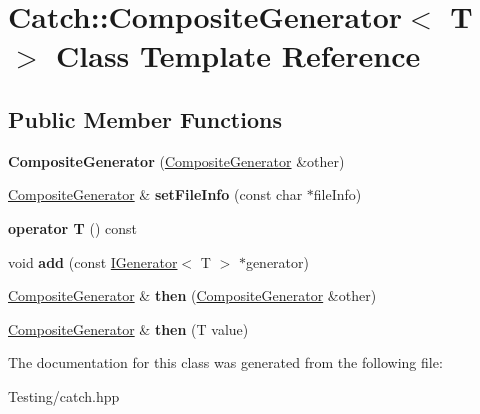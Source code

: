 \hypertarget{class_catch_1_1_composite_generator}{\section{Catch\-:\-:Composite\-Generator$<$ T $>$ Class Template Reference}
\label{class_catch_1_1_composite_generator}
}
\subsection*{Public Member Functions}
\begin{DoxyCompactItemize}
\item 
\hypertarget{class_catch_1_1_composite_generator_a21a7070a00e4a6fe021294c356692692}{{\bfseries Composite\-Generator} (\hyperlink{class_catch_1_1_composite_generator}{Composite\-Generator} \&other)}\label{class_catch_1_1_composite_generator_a21a7070a00e4a6fe021294c356692692}

\item 
\hypertarget{class_catch_1_1_composite_generator_ac3c57cf4ca5472f440bf71e2936bcd4a}{\hyperlink{class_catch_1_1_composite_generator}{Composite\-Generator} \& {\bfseries set\-File\-Info} (const char $\ast$file\-Info)}\label{class_catch_1_1_composite_generator_ac3c57cf4ca5472f440bf71e2936bcd4a}

\item 
\hypertarget{class_catch_1_1_composite_generator_aa3f627d84fb256df0404d19d7fd4b784}{{\bfseries operator T} () const }\label{class_catch_1_1_composite_generator_aa3f627d84fb256df0404d19d7fd4b784}

\item 
\hypertarget{class_catch_1_1_composite_generator_af3774d42ad2d3453d089ca599efe0517}{void {\bfseries add} (const \hyperlink{struct_catch_1_1_i_generator}{I\-Generator}$<$ T $>$ $\ast$generator)}\label{class_catch_1_1_composite_generator_af3774d42ad2d3453d089ca599efe0517}

\item 
\hypertarget{class_catch_1_1_composite_generator_a2e03f42df85cdd238aabd77a80b075d5}{\hyperlink{class_catch_1_1_composite_generator}{Composite\-Generator} \& {\bfseries then} (\hyperlink{class_catch_1_1_composite_generator}{Composite\-Generator} \&other)}\label{class_catch_1_1_composite_generator_a2e03f42df85cdd238aabd77a80b075d5}

\item 
\hypertarget{class_catch_1_1_composite_generator_aefdc11bcfccdf07d2db5f0da3ed8758c}{\hyperlink{class_catch_1_1_composite_generator}{Composite\-Generator} \& {\bfseries then} (T value)}\label{class_catch_1_1_composite_generator_aefdc11bcfccdf07d2db5f0da3ed8758c}

\end{DoxyCompactItemize}


The documentation for this class was generated from the following file\-:\begin{DoxyCompactItemize}
\item 
Testing/catch.\-hpp\end{DoxyCompactItemize}
